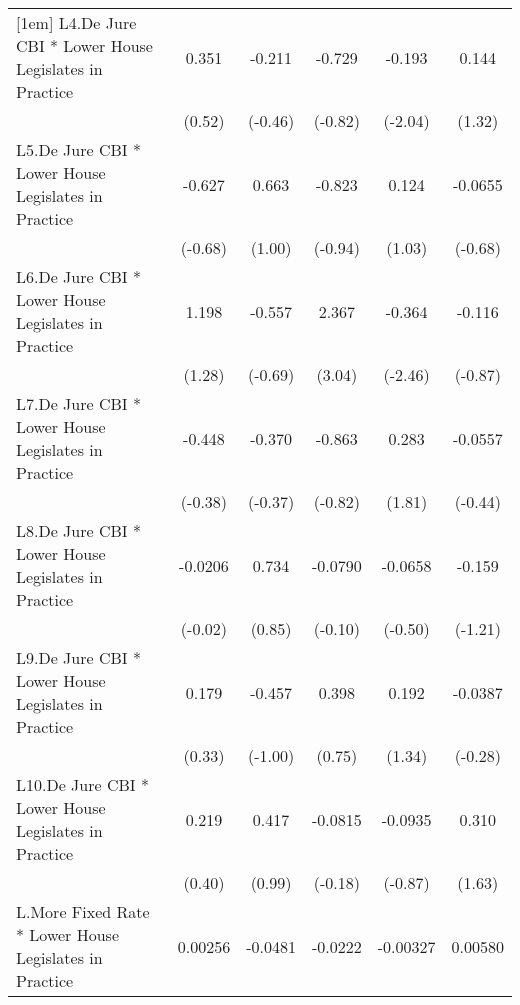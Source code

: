 {\begin{longtable}{l*{5}{c}}
[1em]
L4.De Jure CBI * Lower House Legislates in Practice&    0.351         &   -0.211         &   -0.729         &   -0.193\sym{*}  &    0.144         \\
                &   (0.52)         &  (-0.46)         &  (-0.82)         &  (-2.04)         &   (1.32)         \\
[1em]
L5.De Jure CBI * Lower House Legislates in Practice&   -0.627         &    0.663         &   -0.823         &    0.124         &  -0.0655         \\
                &  (-0.68)         &   (1.00)         &  (-0.94)         &   (1.03)         &  (-0.68)         \\
[1em]
L6.De Jure CBI * Lower House Legislates in Practice&    1.198         &   -0.557         &    2.367\sym{**} &   -0.364\sym{*}  &   -0.116         \\
                &   (1.28)         &  (-0.69)         &   (3.04)         &  (-2.46)         &  (-0.87)         \\
[1em]
L7.De Jure CBI * Lower House Legislates in Practice&   -0.448         &   -0.370         &   -0.863         &    0.283         &  -0.0557         \\
                &  (-0.38)         &  (-0.37)         &  (-0.82)         &   (1.81)         &  (-0.44)         \\
[1em]
L8.De Jure CBI * Lower House Legislates in Practice&  -0.0206         &    0.734         &  -0.0790         &  -0.0658         &   -0.159         \\
                &  (-0.02)         &   (0.85)         &  (-0.10)         &  (-0.50)         &  (-1.21)         \\
[1em]
L9.De Jure CBI * Lower House Legislates in Practice&    0.179         &   -0.457         &    0.398         &    0.192         &  -0.0387         \\
                &   (0.33)         &  (-1.00)         &   (0.75)         &   (1.34)         &  (-0.28)         \\
[1em]
L10.De Jure CBI * Lower House Legislates in Practice&    0.219         &    0.417         &  -0.0815         &  -0.0935         &    0.310         \\
                &   (0.40)         &   (0.99)         &  (-0.18)         &  (-0.87)         &   (1.63)         \\
[1em]
L.More Fixed Rate * Lower House Legislates in Practice&  0.00256         &  -0.0481         &  -0.0222         & -0.00327         &  0.00580         \\

\end{longtable}}
